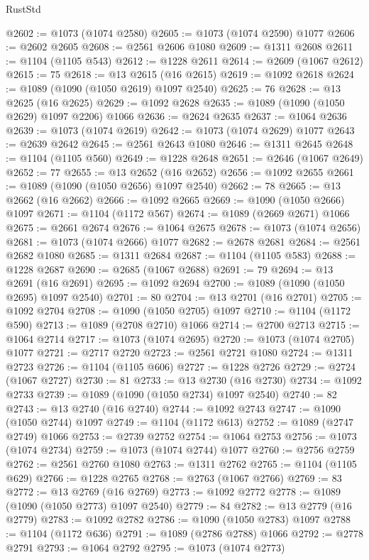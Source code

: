 \begin{lexlean}{RustStd}
\begin{coremodule}
{\begin{coremodule}
{{{{{{{{{{{{{{@2602 := @1073 (@1074 @2580)
@2605 := @1073 (@1074 @2590) @1077
@2606 := @2602 @2605
@2608 := @2561 @2606 @1080
@2609 := @1311 @2608
@2611 := @1104 (@1105 @543)
@2612 := @1228 @2611
@2614 := @2609 (@1067 @2612)
@2615 := 75
@2618 := @13 @2615 (@16 @2615)
@2619 := @1092 @2618
@2624 := @1089 (@1090 (@1050 @2619) @1097 @2540)
@2625 := 76
@2628 := @13 @2625 (@16 @2625)
@2629 := @1092 @2628
@2635 := @1089 (@1090 (@1050 @2629) @1097 @2206) @1066
@2636 := @2624 @2635
@2637 := @1064 @2636
@2639 := @1073 (@1074 @2619)
@2642 := @1073 (@1074 @2629) @1077
@2643 := @2639 @2642
@2645 := @2561 @2643 @1080
@2646 := @1311 @2645
@2648 := @1104 (@1105 @560)
@2649 := @1228 @2648
@2651 := @2646 (@1067 @2649)
@2652 := 77
@2655 := @13 @2652 (@16 @2652)
@2656 := @1092 @2655
@2661 := @1089 (@1090 (@1050 @2656) @1097 @2540)
@2662 := 78
@2665 := @13 @2662 (@16 @2662)
@2666 := @1092 @2665
@2669 := @1090 (@1050 @2666) @1097
@2671 := @1104 (@1172 @567)
@2674 := @1089 (@2669 @2671) @1066
@2675 := @2661 @2674
@2676 := @1064 @2675
@2678 := @1073 (@1074 @2656)
@2681 := @1073 (@1074 @2666) @1077
@2682 := @2678 @2681
@2684 := @2561 @2682 @1080
@2685 := @1311 @2684
@2687 := @1104 (@1105 @583)
@2688 := @1228 @2687
@2690 := @2685 (@1067 @2688)
@2691 := 79
@2694 := @13 @2691 (@16 @2691)
@2695 := @1092 @2694
@2700 := @1089 (@1090 (@1050 @2695) @1097 @2540)
@2701 := 80
@2704 := @13 @2701 (@16 @2701)
@2705 := @1092 @2704
@2708 := @1090 (@1050 @2705) @1097
@2710 := @1104 (@1172 @590)
@2713 := @1089 (@2708 @2710) @1066
@2714 := @2700 @2713
@2715 := @1064 @2714
@2717 := @1073 (@1074 @2695)
@2720 := @1073 (@1074 @2705) @1077
@2721 := @2717 @2720
@2723 := @2561 @2721 @1080
@2724 := @1311 @2723
@2726 := @1104 (@1105 @606)
@2727 := @1228 @2726
@2729 := @2724 (@1067 @2727)
@2730 := 81
@2733 := @13 @2730 (@16 @2730)
@2734 := @1092 @2733
@2739 := @1089 (@1090 (@1050 @2734) @1097 @2540)
@2740 := 82
@2743 := @13 @2740 (@16 @2740)
@2744 := @1092 @2743
@2747 := @1090 (@1050 @2744) @1097
@2749 := @1104 (@1172 @613)
@2752 := @1089 (@2747 @2749) @1066
@2753 := @2739 @2752
@2754 := @1064 @2753
@2756 := @1073 (@1074 @2734)
@2759 := @1073 (@1074 @2744) @1077
@2760 := @2756 @2759
@2762 := @2561 @2760 @1080
@2763 := @1311 @2762
@2765 := @1104 (@1105 @629)
@2766 := @1228 @2765
@2768 := @2763 (@1067 @2766)
@2769 := 83
@2772 := @13 @2769 (@16 @2769)
@2773 := @1092 @2772
@2778 := @1089 (@1090 (@1050 @2773) @1097 @2540)
@2779 := 84
@2782 := @13 @2779 (@16 @2779)
@2783 := @1092 @2782
@2786 := @1090 (@1050 @2783) @1097
@2788 := @1104 (@1172 @636)
@2791 := @1089 (@2786 @2788) @1066
@2792 := @2778 @2791
@2793 := @1064 @2792
@2795 := @1073 (@1074 @2773)
}}}}}}}}}}}}}}
\end{coremodule}}
\end{coremodule}
\end{lexlean}
